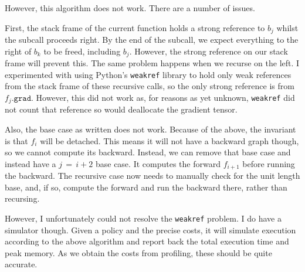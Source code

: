 However, this algorithm does not work.
There are a number of issues.

First, the stack frame of the current function holds a strong reference to \(b_j\) whilst the subcall proceeds right.
By the end of the subcall, we expect everything to the right of \(b_k\) to be freed, including \(b_j\).
However, the strong reference on our stack frame will prevent this.
The same problem happens when we recurse on the left.
I experimented with using Python's \texttt{weakref} library to hold only weak references from the stack frame of these recursive calls, so the only strong reference is from \(f_j\texttt{.grad}\).
However, this did not work as, for reasons as yet unknown, \texttt{weakref} did not count that reference so would deallocate the gradient tensor.

Also, the base case as written does not work.
Because of the above, the invariant is that \(f_i\) will be detached.
This means it will not have a backward graph though, so we cannot compute its backward.
Instead, we can remove that base case and instead have a \(j\,=\,i+2\) base case.
It computes the forward \(f_{i+1}\) before running the backward.
The recursive case now needs to manually check for the unit length base, and, if so, compute the forward and run the backward there, rather than recursing.

However, I unfortunately could not resolve the \texttt{weakref} problem.
I do have a simulator though.
Given a policy and the precise costs, it will simulate execution according to the above algorithm and report back the total execution time and peak memory.
As we obtain the costs from profiling, these should be quite accurate.
